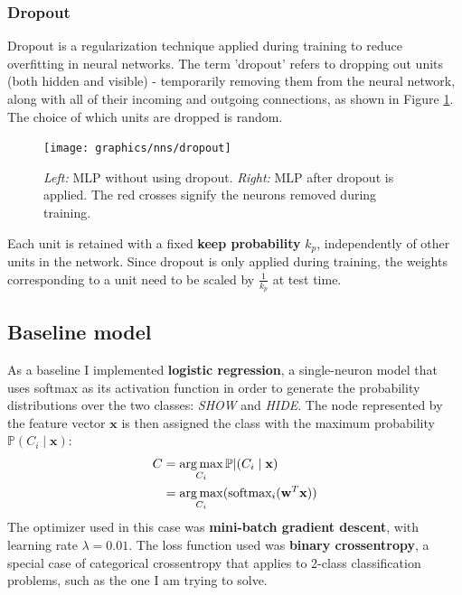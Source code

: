	\subsubsection{Dropout} \label{Section: impl/ml/reg/dropout}
	Dropout\cite{dropout} is a regularization technique applied during training to reduce overfitting in neural networks. The term 'dropout' refers to  dropping out units (both hidden and visible) - temporarily removing them from the neural network, along with all of their incoming and outgoing connections, as shown in Figure \ref{Fig: impl/ml/dropout}. The choice of which units are dropped is random.
	\begin{figure}[H]
		\centering
		\texttt{[image: graphics/nns/dropout]}
		\caption{\textit{Left:} MLP without using dropout. \textit{Right:} MLP after dropout is applied. The red crosses signify the neurons removed during training.}
		\label{Fig: impl/ml/dropout}
	\end{figure}
	Each unit is retained with a fixed \textbf{keep probability} $k_p$, independently of other units in the network. Since dropout is only applied during training, the weights corresponding to a unit need to be scaled by $\frac{1}{k_p}$ at test time.
	
	\subsection{Baseline model} \label{Section: impl/ml/baseline}
	As a baseline I implemented \textbf{logistic regression}, a single-neuron model that uses softmax as its activation function in order to generate the probability distributions over the two classes: \textit{SHOW} and \textit{HIDE}. The node represented by the feature vector $\textbf{x}$ is then assigned the class with the maximum probability $\mathbb{P}(C_i\mid \mathbf{x})$:
	\begin{equation}
	\centering
	\begin{split}
		C & = \argmax_{C_i} \mathbb{P}|(C_i\mid \mathbf{x}) \\
		  & = \argmax_{C_i} (\text{softmax}_i (\mathbf{w}^T\mathbf{x}))
	\end{split}
	\end{equation} 
	The optimizer used in this case was \textbf{mini-batch gradient descent}, with learning rate $\lambda = 0.01$. The loss function used was \textbf{binary crossentropy}, a special case of categorical crossentropy that applies to 2-class classification problems, such as the one I am trying to solve. 
	
